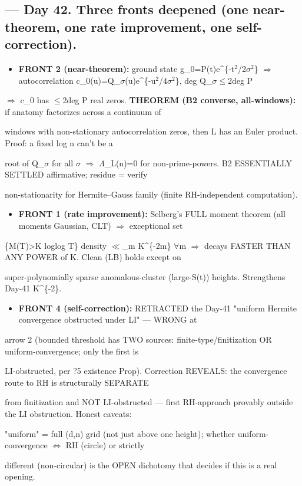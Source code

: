 \documentclass[10pt]{article}
\begin{document}
\subsection*{ --- Day 42. Three fronts deepened (one near-theorem, one rate improvement, one self-correction).}
\begin{itemize}
\item \textbf{FRONT 2 (near-theorem):} ground state g\_0=P(t)e\textasciicircum{}\{-t\ensuremath{^2}/2\ensuremath{\sigma}\ensuremath{^2}\} \ensuremath{\Rightarrow} autocorrelation c\_0(u)=Q\_\ensuremath{\sigma}(u)e\textasciicircum{}\{-u\ensuremath{^2}/4\ensuremath{\sigma}\ensuremath{^2}\}, deg Q\_\ensuremath{\sigma}\ensuremath{\le}2deg P
\end{itemize}
  \ensuremath{\Rightarrow} c\_0 has \ensuremath{\le}2deg P real zeros. \textbf{THEOREM (B2 converse, all-windows):} if anatomy factorizes across a continuum of\par
  windows with non-stationary autocorrelation zeros, then L has an Euler product. Proof: a fixed log n can't be a\par
  root of Q\_\ensuremath{\sigma} for all \ensuremath{\sigma} \ensuremath{\Rightarrow} \ensuremath{\Lambda}\_L(n)=0 for non-prime-powers. B2 ESSENTIALLY SETTLED affirmative; residue = verify\par
  non-stationarity for Hermite--Gauss family (finite RH-independent computation).\par
\begin{itemize}
\item \textbf{FRONT 1 (rate improvement):} Selberg's FULL moment theorem (all moments Gaussian, CLT) \ensuremath{\Rightarrow} exceptional set
\end{itemize}
  \{M(T)>K loglog T\} density \ensuremath{\ll}\_m K\textasciicircum{}\{-2m\} \ensuremath{\forall}m \ensuremath{\Rightarrow} decays FASTER THAN ANY POWER of K. Clean (LB) holds except on\par
  super-polynomially sparse anomalous-cluster (large-S(t)) heights. Strengthens Day-41 K\textasciicircum{}\{-2\}.\par
\begin{itemize}
\item \textbf{FRONT 4 (self-correction):} RETRACTED the Day-41 "uniform Hermite convergence obstructed under LI" --- WRONG at
\end{itemize}
  arrow 2 (bounded threshold has TWO sources: finite-type/finitization OR uniform-convergence; only the first is\par
  LI-obstructed, per ?5 existence Prop). Correction REVEALS: the convergence route to RH is structurally SEPARATE\par
  from finitization and NOT LI-obstructed --- first RH-approach provably outside the LI obstruction. Honest caveats:\par
  "uniform" = full (d,n) grid (not just above one height); whether uniform-convergence \ensuremath{\iff} RH (circle) or strictly\par
  different (non-circular) is the OPEN dichotomy that decides if this is a real opening.\par
\end{document}
